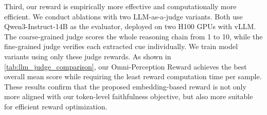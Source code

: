 \documentclass{article}
\theoremstyle{plain}
\theoremstyle{definition}
\theoremstyle{remark}
\begin{document}
Third, our reward is empirically more effective and computationally more efficient.
We conduct ablations with two LLM-as-a-judge variants.
Both use Qwen3-Instruct-14B as the evaluator, deployed on two H100 GPUs with vLLM.
The coarse-grained judge scores the whole reasoning chain from 1 to 10, while the fine-grained judge verifies each extracted cue individually.
We train model variants using only these judge rewards.
As shown in \cref{tab:llm_judge_comparison}, our Omni-Perception Reward achieves the best overall mean score while requiring the least reward computation time per sample.
These results confirm that the proposed embedding-based reward is not only more aligned with our token-level faithfulness objective, but also more suitable for efficient reward optimization.
\end{document}
